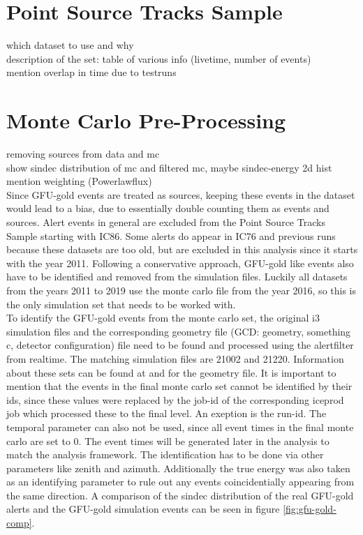 \section{Point Source Tracks Sample}
which dataset to use and why\\
description of the set: table of various info (livetime, number of events)\\
mention overlap in time due to testruns\\

\section{Monte Carlo Pre-Processing}
removing sources from data and mc\\
show sindec distribution of mc and filtered mc, maybe sindec-energy 2d hist\\
mention weighting (Powerlawflux)\\

Since GFU-gold events are treated as sources, keeping these events in the dataset would lead to a bias, due to essentially double counting them as events and sources.
Alert events in general are excluded from the Point Source Tracks Sample starting with IC86.
Some alerts do appear in IC76 and previous runs because these datasets are too old, but are excluded in this analysis since it starts with the year 2011.
Following a conservative approach, GFU-gold like events also have to be identified and removed from the simulation files.
Luckily all datasets from the years 2011 to 2019 use the monte carlo file from the year 2016, so this is the only simulation set that needs to be worked with.\\
To identify the GFU-gold events from the monte carlo set, the original i3 simulation files and the corresponding geometry file (GCD: geometry, something c, detector configuration) file need to be found and processed using the alertfilter from realtime.
The matching simulation files are 21002 and 21220.
Information about these sets can be found at \cite{sim} and \cite{gcd} for the geometry file.
It is important to mention that the events in the final monte carlo set cannot be identified by their ids, since these values were replaced by the job-id of the corresponding iceprod job which processed these to the final level. An exeption is the run-id.
The temporal parameter can also not be used, since all event times in the final monte carlo are set to \num{0}.
The event times will be generated later in the analysis to match the analysis framework.
The identification has to be done via other parameters like zenith and azimuth.
Additionally the true energy was also taken as an identifying parameter to rule out any events coincidentially appearing from the same direction.
A comparison of the sindec distribution of the real GFU-gold alerts and the GFU-gold simulation events can be seen in figure \ref{fig:gfu-gold-comp}.

